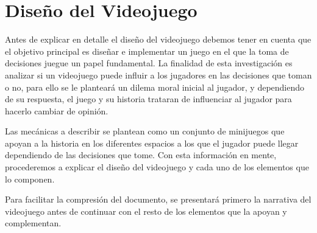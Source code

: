 \section{Diseño del Videojuego}\label{sec:diseño}

Antes de explicar en detalle el diseño del videojuego debemos tener en cuenta que el objetivo principal es diseñar e implementar un juego en el que la toma de decisiones juegue un papel fundamental. La finalidad de esta investigación es analizar si un videojuego puede influir a los jugadores en las decisiones que toman o no, para ello se le planteará un dilema moral inicial al jugador, y dependiendo de su respuesta, el juego y su historia trataran de influenciar al jugador para hacerlo cambiar de opinión.

Las mecánicas a describir se plantean como un conjunto de minijuegos que apoyan a la historia en los diferentes espacios a los que el jugador puede llegar dependiendo de las decisiones que tome. Con esta información en mente, procederemos a explicar el diseño del videojuego y cada uno de los elementos que lo componen.

Para facilitar la compresión del documento, se presentará primero la narrativa del videojuego antes de continuar con el resto de los elementos que la apoyan y complementan.






